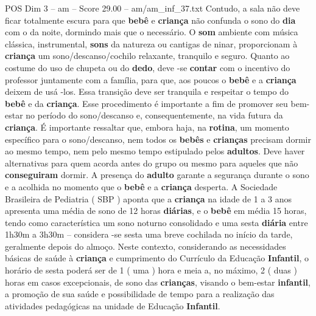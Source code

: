 \begin{textsample}{POS Dim 3 – am – Score 29.00 – am/am\_inf\_37.txt}
Contudo, a sala não deve ficar totalmente escura para que \textbf{bebê} e \textbf{criança} não confunda o sono do \textbf{dia} com o da noite, dormindo mais que o necessário.
O \textbf{som} ambiente com música clássica, instrumental, \textbf{sons} da natureza ou cantigas de ninar, proporcionam à \textbf{criança} um sono/descanso/cochilo relaxante, tranquilo e seguro.
Quanto ao costume do uso de chupeta ou do \textbf{dedo}, deve -se \textbf{contar} com o incentivo do professor juntamente com a família, para que, aos poucos o \textbf{bebê} e a \textbf{criança} deixem de usá -los.
Essa transição deve ser tranquila e respeitar o tempo do \textbf{bebê} e da \textbf{criança}.
Esse procedimento é importante a fim de promover seu bem-estar no período do sono/descanso e, consequentemente, na vida futura da \textbf{criança}.
É importante ressaltar que, embora haja, na \textbf{rotina}, um momento específico para o sono/descanso, nem todos os \textbf{bebês} e \textbf{crianças} precisam dormir ao mesmo tempo, nem pelo mesmo tempo estipulado pelos \textbf{adultos}.
Deve haver alternativas para quem acorda antes do grupo ou mesmo para aqueles que não \textbf{conseguiram} dormir.
A presença do \textbf{adulto} garante a segurança durante o sono e a acolhida no momento que o \textbf{bebê} e a \textbf{criança} desperta.
A Sociedade Brasileira de Pediatria ( SBP ) aponta que a \textbf{criança} na idade de 1 a 3 anos apresenta uma média de sono de 12 horas \textbf{diárias}, e o \textbf{bebê} em média 15 horas, tendo como característica um sono noturno consolidado e uma sesta \textbf{diária} entre 1h30m a 3h30m – considera -se sesta uma breve cochilada no início da tarde, geralmente depois do almoço.
Neste contexto, considerando as necessidades básicas de saúde à \textbf{criança} e cumprimento do Currículo da Educação \textbf{Infantil}, o horário de sesta poderá ser de 1 ( uma ) hora e meia a, no máximo, 2 ( duas ) horas em casos excepcionais, de sono das \textbf{crianças}, visando o bem-estar \textbf{infantil}, a promoção de sua saúde e possibilidade de tempo para a realização das atividades pedagógicas na unidade de Educação \textbf{Infantil}.

\end{textsample}
